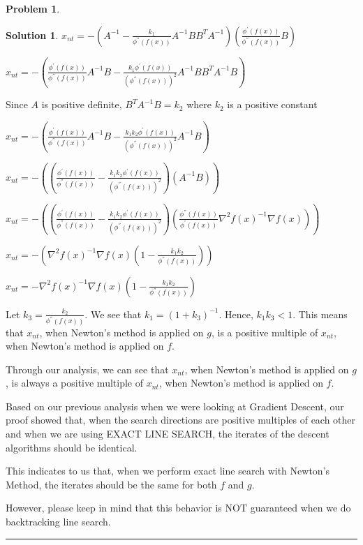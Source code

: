 \documentclass{article}
\theoremstyle{definition}
\newtheorem{problem}{Problem}
\def\fline{\rule{0.75\linewidth}{0.5pt}}
\newcommand{\finishline}{\begin{center}\fline\end{center}}
\newtheorem*{solution*}{Solution}
\newenvironment{solution}{\begin{solution*}}{{\finishline} \end{solution*}}
\begin{document}
\begin{problem}
\begin{solution}
$x_{nt} = -(A^{-1} - \frac{k_1}{\phi^{''}(f(x))} A^{-1}B  B^TA^{-1}) ( \frac{\phi^{'}(f(x))}{\phi^{''}(f(x))} B)$

$x_{nt} = -(\frac{\phi^{'}(f(x))}{\phi^{''}(f(x))} A^{-1}B - \frac{k_1 \phi^{'}(f(x))}{(\phi^{''}(f(x)))^2} A^{-1}B  B^TA^{-1}B)$

Since $A$ is positive definite, $B^TA^{-1}B = k_2$ where $k_2$ is a positive constant

$x_{nt} = -(\frac{\phi^{'}(f(x))}{\phi^{''}(f(x))} A^{-1}B - \frac{k_1 k_2 \phi^{'}(f(x))}{(\phi^{''}(f(x)))^2} A^{-1}B)$

$x_{nt} = -( (\frac{\phi^{'}(f(x))}{\phi^{''}(f(x))} - \frac{k_1 k_2 \phi^{'}(f(x))}{(\phi^{''}(f(x)))^2}) (A^{-1}B))$

$x_{nt} = -((\frac{\phi^{'}(f(x))}{\phi^{''}(f(x))} - \frac{k_1 k_2 \phi^{'}(f(x))}{(\phi^{''}(f(x)))^2}) (\frac{\phi^{''}(f(x))}{\phi^{'}(f(x))} \nabla^2f(x)^{-1} \nabla f(x)))$


$x_{nt} = -(\nabla^2f(x)^{-1} \nabla f(x) ( 1 - \frac{k_1 k_2}{\phi^{''}(f(x))}))$

$x_{nt} = -\nabla^2f(x)^{-1} \nabla f(x) (1 - \frac{k_1 k_2}{\phi^{''}(f(x))})$

Let $k_3 = \frac{k_2}{\phi^{''}(f(x))}$. We see that $k_1 = (1 + k_3)^{-1}$. Hence, $k_1k_3 < 1$. This means that $x_{nt}$, when Newton's method is applied on $g$, is a positive multiple of $x_{nt}$, when Newton's method is applied on $f$.

Through our analysis, we can see that $x_{nt}$, when Newton's method is applied on $g$, is always a positive multiple of $x_{nt}$, when Newton's method is applied on $f$.

Based on our previous analysis when we were looking at Gradient Descent, our proof showed that, when the search directions are positive multiples of each other and when we are using EXACT LINE SEARCH, the iterates of the descent algorithms should be identical. 

This indicates to us that, when we perform exact line search with Newton's Method, the iterates should be the same for both $f$ and $g$. 

However, please keep in mind that this behavior is NOT guaranteed when we do backtracking line search. 


\end{solution}
\end{problem}
\end{document}
